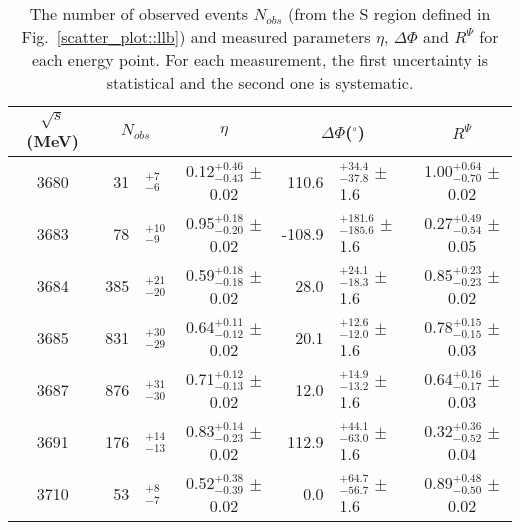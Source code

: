 \documentclass[a4paper,11pt]{article}
\begin{document}
\begin{table}[!htbp]
\scriptsize
\caption{The number of observed events $N_{obs}$ (from the S region defined in Fig.~\ref{scatter_plot::llb}) and measured parameters $\eta$, $\Delta\Phi$ and $R^{\Psi}$ for each energy point. For each measurement, the first uncertainty is statistical and the second one is systematic.}
\centering
\begin{tabular}{cr@{}lcr@{}lc}
\hline
\hline
$\sqrt{s}$ (MeV)	&\multicolumn{2}{c}{$N_{obs}$}				&$\eta$  &\multicolumn{2}{c}{$\Delta\Phi$($^\circ$)}    & $R^{\Psi}$\\
\hline
		3680    & 31&$^{+7}_{-6}$        &0.12$^{+0.46}_{-0.43}$ $\pm$ 0.02  &110.6&$^{+34.4}_{-37.8}$ $\pm$ 1.6   & 1.00$^{+0.64}_{-0.70}$ $\pm$ 0.02 \\
        3683    & 78&$^{+10}_{-9}$         &0.95$^{+0.18}_{-0.20}$ $\pm$ 0.02  &-108.9&$^{+181.6}_{-185.6}$ $\pm$ 1.6   & 0.27$^{+0.49}_{-0.54}$ $\pm$ 0.05\\
        3684     & 385&$^{+21}_{-20}$        &0.59$^{+0.18}_{-0.18}$ $\pm$ 0.02  &28.0&$^{+24.1}_{-18.3}$ $\pm$ 1.6   & 0.85$^{+0.23}_{-0.23}$ $\pm$ 0.02\\
        3685     & 831&$^{+30}_{-29}$        &0.64$^{+0.11}_{-0.12}$ $\pm$ 0.02  &20.1&$^{+12.6}_{-12.0}$ $\pm$ 1.6   & 0.78$^{+0.15}_{-0.15}$ $\pm$ 0.03\\
        3687    & 876&$^{+31}_{-30}$         &0.71$^{+0.12}_{-0.13}$ $\pm$ 0.02  &12.0&$^{+14.9}_{-13.2}$ $\pm$ 1.6   & 0.64$^{+0.16}_{-0.17}$ $\pm$ 0.03\\
        3691    & 176&$^{+14}_{-13}$         &0.83$^{+0.14}_{-0.23}$ $\pm$ 0.02  &112.9&$^{+44.1}_{-63.0}$ $\pm$ 1.6   & 0.32$^{+0.36}_{-0.52}$ $\pm$ 0.04\\
        3710     & 53&$^{+8}_{-7}$        &0.52$^{+0.38}_{-0.39}$ $\pm$ 0.02  &0.0&$^{+64.7}_{-56.7}$ $\pm$ 1.6	 & 0.89$^{+0.48}_{-0.50}$ $\pm$ 0.02\\

\hline
\hline
\end{tabular}
\label{summary}
\end{table}
\end{document}
